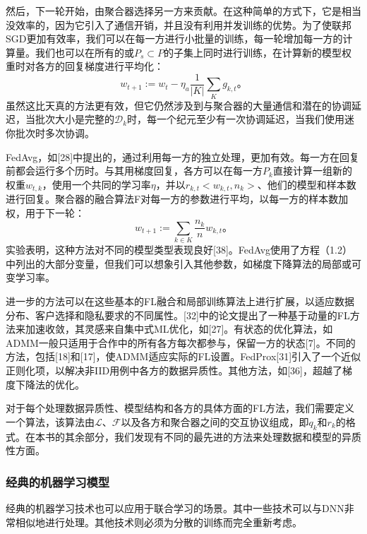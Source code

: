 然后，下一轮开始，由聚合器选择另一方来贡献。在这种简单的方式下，它是相当没效率的，因为它引入了通信开销，并且没有利用并发训练的优势。为了使联邦SGD更加有效率，我们可以在每一方进行小批量的训练，每一轮增加每一方的计算量。我们也可以在所有的或$P_{s} \subset P$的子集上同时进行训练，在计算新的模型权重时对各方的回复梯度进行平均化：
$$
w_{t+1} := w_{t} - \eta_{a}\frac{1}{|K|}\sum_{K}g_{k, t}。
$$
虽然这比天真的方法更有效，但它仍然涉及到与聚合器的大量通信和潜在的协调延迟，当批次大小是完整的$\mathcal{D}_{k}$时，每一个纪元至少有一次协调延迟，当我们使用迷你批次时多次协调。

FedAvg，如[28]中提出的，通过利用每一方的独立处理，更加有效。每一方在回复前都会运行多个历时。与其用梯度回复，各方可以在每一方$P_{k}$直接计算一组新的权重$w_{t,k}$，使用一个共同的学习率$\eta$，并以$r_{k,t}<w_{k,t}, n_{k}>$、他们的模型和样本数进行回复。聚合器的融合算法F对每一方的参数进行平均，以每一方的样本数加权，用于下一轮：
$$
w_{t+1} := \sum_{k \in K}\frac{n_{k}}{n}w_{k, t}。
$$
实验表明，这种方法对不同的模型类型表现良好[38]。FedAvg使用了方程（1.2）中列出的大部分变量，但我们可以想象引入其他参数，如梯度下降算法的局部或可变学习率。

进一步的方法可以在这些基本的FL融合和局部训练算法上进行扩展，以适应数据分布、客户选择和隐私要求的不同属性。[32]中的论文提出了一种基于动量的FL方法来加速收敛，其灵感来自集中式ML优化，如[27]。有状态的优化算法，如ADMM一般只适用于合作中的所有各方每次都参与，保留一方的状态[7]。不同的方法，包括[18]和[17]，使ADMM适应实际的FL设置。FedProx[31]引入了一个近似正则化项，以解决非IID用例中各方的数据异质性。其他方法，如[36]，超越了梯度下降法的优化。

对于每个处理数据异质性、模型结构和各方的具体方面的FL方法，我们需要定义一个算法，该算法由$\mathcal{L}$、$\mathcal{F}$以及各方和聚合器之间的交互协议组成，即$q_{k}$和$r_{k}$的格式。在本书的其余部分，我们发现有不同的最先进的方法来处理数据和模型的异质性方面。

\subsubsection{经典的机器学习模型}

经典的机器学习技术也可以应用于联合学习的场景。其中一些技术可以与DNN非常相似地进行处理。其他技术则必须为分散的训练而完全重新考虑。

